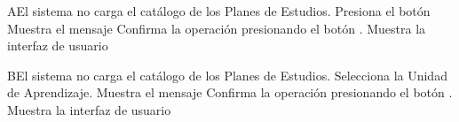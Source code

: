 
\begin{comment}
\begin{UCtrayectoriaA}{A}{El sistema no encuentra ningún formulario para mostrar.}
	\UCpaso No encuentra ningún formulario para mostrar.
    \UCpaso El sistema muestra el mensaje \MSGref{MSG6}{Por el momento no se puede registrar la bibliografía}.
    \UCpaso[\UCactor] Cierra el mensaje presionando el botón \IUbutton{Aceptar}.
    \UCpaso Continua en el paso 1 de la trayectoria principal del \UCref{CU1}.
\end{UCtrayectoriaA}
\end{comment}


\begin{UCtrayectoriaA}{A}{El sistema no carga el catálogo de los Planes de Estudios.}
	\UCpaso[\UCactor] Presiona el botón 
	\UCpaso Muestra el mensaje 
	\UCpaso[\UCactor] Confirma la operación presionando el botón .
	 \UCpaso Muestra la interfaz de usuario 

\end{UCtrayectoriaA}





\begin{UCtrayectoriaA}{B}{El sistema no carga el catálogo de los Planes de Estudios.}
	\UCpaso[\UCactor]Selecciona la Unidad de Aprendizaje.
	\UCpaso Muestra el mensaje 
	\UCpaso[\UCactor] Confirma la operación presionando el botón .
	\UCpaso Muestra la interfaz de usuario 
	
\end{UCtrayectoriaA}
